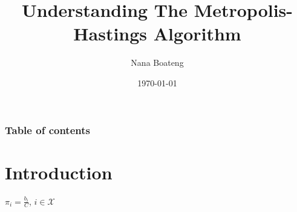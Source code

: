 \documentclass[hyperref={pdfpagelabels=false}]{beamer}
\title{Understanding The Metropolis-Hastings Algorithm}
\author{Nana Boateng 
}
\date{\today}
\begin{document}
\begin{frame}
\titlepage
\end{frame} 

\begin{frame}
\frametitle{Table of contents}
\tableofcontents
\end{frame}
 


\section{Introduction} 


$\pi_{i}=\frac{b_{i}}{C}$, \hspace{10mm}$i \in \mathcal{X}$

\end{document}

